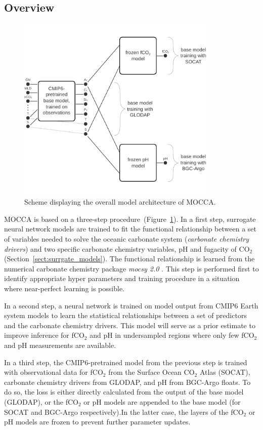 \documentclass{article}
\begin{document}
	\subsection{Overview}
	\begin{figure}
		\includegraphics[width=0.85\textwidth]{./figures/model_architecture_scheme.pdf}
		\caption{Scheme displaying the overall model architecture of MOCCA.}
		\label{fig:fco2_model}
	\end{figure}
	MOCCA is based on a three-step procedure~(Figure~\ref{fig:fco2_model}). In a first step, surrogate neural network models are trained to fit the functional relationship between a set of variables needed to solve the oceanic carbonate system (\textit{carbonate chemistry drivers}) and two specific carbonate chemistry variables, pH and fugacity of CO$_2$ (Section~\ref{sect:surrgate_models}). The functional relationship is learned from the numerical carbonate chemistry package \textit{mocsy 2.0} \citep{orr2015}. This step is performed first to identify appropriate hyper parameters and training procedure in a situation where near-perfect learning is possible.
	
	In a second step, a neural network is trained on model output from CMIP6 Earth system models to learn the statistical relationships between a set of predictors and the carbonate chemistry drivers. This model will serve as a prior estimate to improve inference for fCO$_2$ and pH in undersampled regions where only few fCO$_2$ and pH measurements are available.
	
	In a third step, the CMIP6-pretrained model from the previous step is trained with observational data for fCO$_2$ from the Surface Ocean CO$_2$ Atlas (SOCAT), carbonate chemistry drivers from GLODAP, and pH from BGC-Argo floats. To do so, the loss is either directly calculated from the output of the base model (GLODAP), or the fCO$_2$ or pH models are appended to the base model (for SOCAT and BGC-Argo respectively).In the latter case, the layers of the fCO$_2$ or pH models are frozen to prevent further parameter updates.
	
\end{document}
